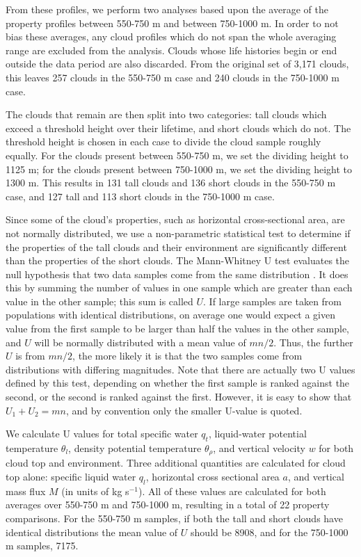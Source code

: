 \documentclass[acp]{copernicus}
\begin{document}
From these profiles, we perform two analyses based upon the average of the 
property profiles between 550-750 m and between 750-1000 m.  In order to not 
bias these averages, any cloud profiles which do not span the whole averaging 
range are excluded from the analysis.  Clouds whose life histories begin or end 
outside the data period are also discarded.  From the original set of 3,171 
clouds, this leaves 257 clouds in the 550-750 m case and 240 clouds in the 
750-1000 m case.

The clouds that remain are then split into two categories: tall clouds which 
exceed a threshold height over their lifetime, and short clouds which do not.  
The threshold height is chosen in each case to divide the cloud sample roughly 
equally.  For the clouds present between 550-750 m, we set the dividing 
height to 1125 m; for the clouds present between 750-1000 m, we set the 
dividing height to 1300 m.  This results in 131 tall clouds and 136 short 
clouds in the 550-750 m case, and 127 tall and 113 short clouds in the 
750-1000 m case.

Since some of the cloud's properties, such as horizontal cross-sectional area, 
are not normally distributed, we use a non-parametric statistical test to 
determine if the properties of the tall clouds and their environment are 
significantly different than the properties of the short clouds.  The 
Mann-Whitney U test evaluates the null hypothesis that two data samples come 
from the same distribution \citep{Mann1947}.  It does this by summing the 
number of values in one sample which are greater than each value in the other 
sample; this sum is called $U$.  If large samples are taken from populations 
with identical distributions, on average one would expect a given value from 
the first sample to be larger than half the values in the other sample, and $U$ 
will be normally distributed with a mean value of $mn/2$.  Thus, the further 
$U$ is from $mn/2$, the more likely it is that the two samples come from 
distributions with differing magnitudes.  Note that there are actually two U 
values defined by this test, depending on whether the first sample is ranked 
against the second, or the second is ranked against the first.  However, it is 
easy to show that $U_1 + U_2 = mn$, and by convention only the smaller U-value 
is quoted.

We calculate U values for total specific water $q_t$, liquid-water potential 
temperature $\theta_l$, density potential temperature $\theta_\rho$, and 
vertical velocity $w$ for both cloud top and environment.  Three additional 
quantities are calculated for cloud top alone: specific liquid water $q_l$, 
horizontal cross sectional area $a$, and vertical mass flux $M$ (in units of 
kg s$^{-1}$).  All of these values are calculated for both averages over 
550-750 m and 750-1000 m, resulting in a total of 22 property comparisons.  
For the 550-750 m samples, if both the tall and short clouds have identical 
distributions the mean value of $U$ should be 8908, and for the 750-1000 m 
samples, 7175.  
\end{document}
